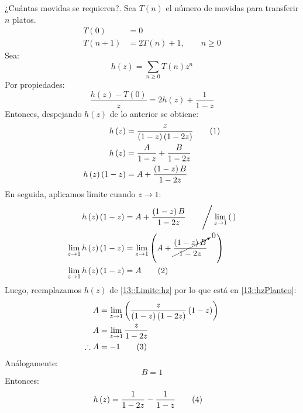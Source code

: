 \documentclass[english, spanish, fleqn, 10pt]{article}
\numberwithin{equation}{section}
\newcommand{\nparentesis}[1]{\left( #1 \right)}
\theoremstyle{definition}
\newcommand\numberthis{\addtocounter{equation}{1}\tag{\theequation}}
\begin{document}
¿Cuántas movidas se requieren?. Sea $T\nparentesis{n}$ el número de movidas para transferir $n$ platos.
\begin{align*}
T\nparentesis{0}&=0\\
T\nparentesis{n+1}&=2T\nparentesis{n}+1,\qquad n\geq 0
\end{align*}
Sea:
\begin{equation}\label{13::Generatriz:hz}
h\nparentesis{z}=\sum_{n\geq 0}T\nparentesis{n}z^n
\end{equation}
Por propiedades:
\begin{equation*}
\dfrac{h\nparentesis{z}-T\nparentesis{0}}{z}=2h\nparentesis{z}+\dfrac{1}{1-z}
\end{equation*}
Entonces, despejando $h\nparentesis{z}$ de lo anterior se obtiene:
\begin{align*}
h\nparentesis{z}&=\dfrac{z}{\nparentesis{1-z}\nparentesis{1-2z}}\numberthis\label{13::hzPlanteo}\\
h\nparentesis{z}&=\dfrac{A}{1-z}+\dfrac{B}{1-2z}\\
h\nparentesis{z}\nparentesis{1-z}&=A + \dfrac{\nparentesis{1-z}B}{1-2z}
\end{align*}
En seguida, aplicamos límite cuando $z\rightarrow 1$:
\begin{align*}
h\nparentesis{z}\nparentesis{1-z}&=A + \dfrac{\nparentesis{1-z}B}{1-2z}\qquad\Bigg / \lim_{z\rightarrow 1}\nparentesis{\,}\\
\lim_{z\rightarrow 1}h\nparentesis{z}\nparentesis{1-z}&=\lim_{z\rightarrow 1}\nparentesis{A+\cancelto{0}{\dfrac{\nparentesis{1-z}B}{1-2z}}\hspace{4mm}}\\
\lim_{z\rightarrow 1}h\nparentesis{z}\nparentesis{1-z}&=A\numberthis\label{13::Limite:hz}
\end{align*}
Luego, reemplazamos $h\nparentesis{z}$ de \eqref{13::Limite:hz} por lo que está en \eqref{13::hzPlanteo}:
\begin{align*}
A&=\lim_{z\rightarrow 1}\nparentesis{\dfrac{z}{\nparentesis{1-z}\nparentesis{1-2z}}\nparentesis{1-z}}\\
A&=\lim_{z\rightarrow 1}\dfrac{z}{1-2z}\\
\therefore A&=-1\numberthis
\end{align*}
Análogamente:
\begin{equation}
B=1
\end{equation}
Entonces:
\begin{align*}
h\nparentesis{z}&=\dfrac{1}{1-2z}-\dfrac{1}{1-z}\numberthis\label{13::hz:final}
\end{align*}
\end{document}
